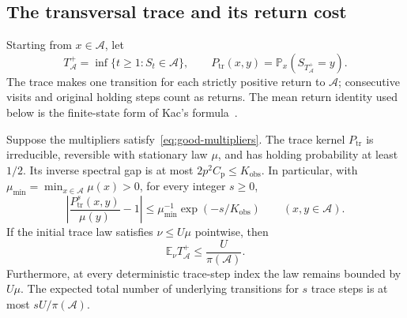 \subsection{The transversal trace and its return cost}

Starting from $x\in\mathcal A$, let
\[
  T_{\mathcal A}^+=\inf\{t\geq1:S_t\in\mathcal A\},
  \qquad
  P_{\mathrm{tr}}(x,y)
     =\mathbb P_x(S_{T_{\mathcal A}^+}=y).
\]
The trace makes one transition for each strictly positive return to
$\mathcal A$; consecutive visits and original holding steps count
as returns.
The mean return identity used below is the finite-state form of
Kac's formula~\cite[Corollary~2.24]{AF2002}.

\begin{lemma}
\label{lem:trace}
Suppose the multipliers satisfy~\eqref{eq:good-multipliers}.
The trace kernel $P_{\mathrm{tr}}$ is irreducible, reversible with
stationary law $\mu$, and has holding probability at least $1/2$.
Its inverse spectral gap is at most
$2p^2C_{\mathrm p}\leq K_{\mathrm{obs}}$.
In particular, with
$\mu_{\min}=\min_{x\in\mathcal A}\mu(x)>0$, for every integer $s\geq0$,
\begin{equation}
 \left|\frac{P_{\mathrm{tr}}^s(x,y)}{\mu(y)}-1\right|
 \leq\mu_{\min}^{-1}\exp(-s/K_{\mathrm{obs}})
 \qquad(x,y\in\mathcal A).
 \label{eq:trace-relative-mixing}
\end{equation}
If the initial trace law satisfies $\nu\leq U\mu$ pointwise, then
\begin{equation}
  \mathbb E_\nu T_{\mathcal A}^+
       \leq\frac{U}{\pi(\mathcal A)}.
  \label{eq:trace-return-cost}
\end{equation}
Furthermore, at every deterministic trace-step index the law remains
bounded by $U\mu$. The expected total number of underlying
transitions for $s$ trace steps is at most $sU/\pi(\mathcal A)$.
\end{lemma}


